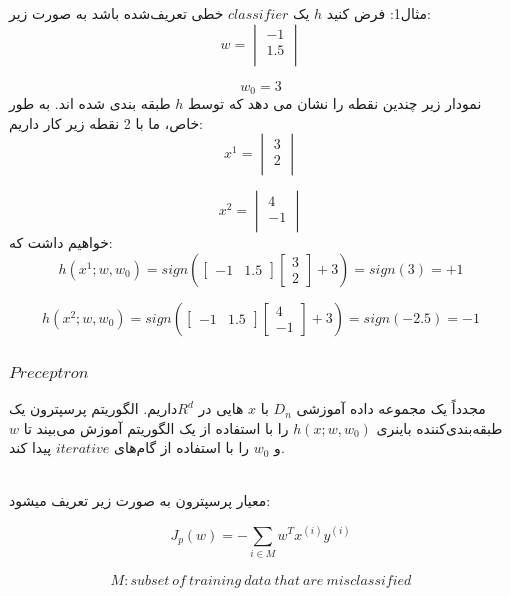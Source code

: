 \documentclass[12pt]{article}
\begin{document}
مثال1: فرض کنید $h$ یک $classifier$ خطی تعریف‌شده باشد به صورت زیر:
\[
w=\begin{vmatrix}
-1 \\
1.5 \\
\end{vmatrix}
\]

\[
w_0=3
\]
نمودار زیر چندین نقطه را نشان می دهد که توسط $h$ طبقه بندی شده اند. به طور خاص، ما با 2 نقطه زیر کار داریم:
\[
x^1 =\begin{vmatrix}
3 \\
2 \\
\end{vmatrix}
\]

\[
x^2 =\begin{vmatrix}
4 \\
-1 \\
\end{vmatrix}
\]
خواهیم داشت که:
\[
h(x^1; w,w_0) = sign \left( \begin{bmatrix} -1 & 1.5\end{bmatrix} \begin{bmatrix} 3 \\ 2\end{bmatrix}+ 3 \right)  = sign(3) = +1
\]

\[
h(x^2; w,w_0) = sign \left( \begin{bmatrix} -1 & 1.5\end{bmatrix} \begin{bmatrix} 4 \\ -1\end{bmatrix}+ 3 \right)  = sign(-2.5) = -1
\]

\subsubsection{$Preceptron$}

مجدداً یک مجموعه داده آموزشی $D_n$ با $x$ هایی در $R^d$داریم. الگوریتم پرسپترون یک طبقه‌بندی‌کننده باینری $h(x; w, w_0)$ را با استفاده از یک الگوریتم آموزش می‌بیند تا $w$ و $w_0$ را با استفاده از گام‌های $iterative$ پیدا کند.

\\ 
معيار پرسپترون به صورت زير تعريف ميشود:

\[ J_p(w) = - \sum_{i \in M} w^T x^{(i)} y^{(i)} \]

\begin{align*}
M: subset\:of\:training\:data\:that\:are\:misclassified
\end{align*}
\end{document}
